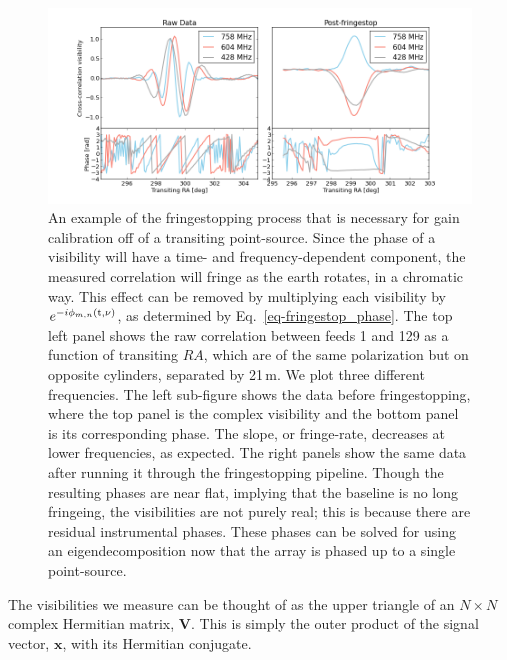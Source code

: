 \begin{figure}[!h]
\begin{center}
\vspace{1cm}
\includegraphics[trim={1in 0in 1in 1in}, width=\smwidth]{./figures/beamforming/thesis_fringestop.png}
\caption[abc]{An example of the fringestopping process that is 
 necessary for gain calibration off of a transiting point-source. Since 
 the phase of a visibility will have a time- and frequency-dependent 
 component, the measured correlation will fringe as the earth rotates, in 
 a chromatic way. This effect can be removed by multiplying each visibility by 
 $e^{-i \phi_{m, n}(\rm t, \nu)}$, as determined by Eq.~\ref{eq-fringestop_phase}. 
 The top left panel shows the raw correlation between feeds 1 and 129 as a function of transiting
 $RA$, which are of the same polarization but 
 on opposite cylinders, separated by 21\,m. We plot  
 three different frequencies. The left sub-figure shows the 
 data before fringestopping, where the top panel 
 is the complex visibility and the bottom panel is its corresponding
 phase. The slope, or fringe-rate, decreases 
 at lower frequencies, as expected. The right panels show the same data 
 after running it through the fringestopping pipeline. Though the resulting 
 phases are near flat, implying that the baseline is no long fringeing, 
 the visibilities are not purely real; this is because there are residual 
 instrumental phases. These phases can be solved for using an 
 eigendecomposition now that the array is phased up to a single point-source.}  
 \label{fig-fringestop}
\end{center}
\end{figure}



The visibilities we measure can be thought of as 
the upper triangle of an $N\times N$ complex Hermitian 
matrix, $\mathbf{V}$. This is simply the outer product of the 
signal vector, $\mathbf{x}$, with its Hermitian conjugate. 

